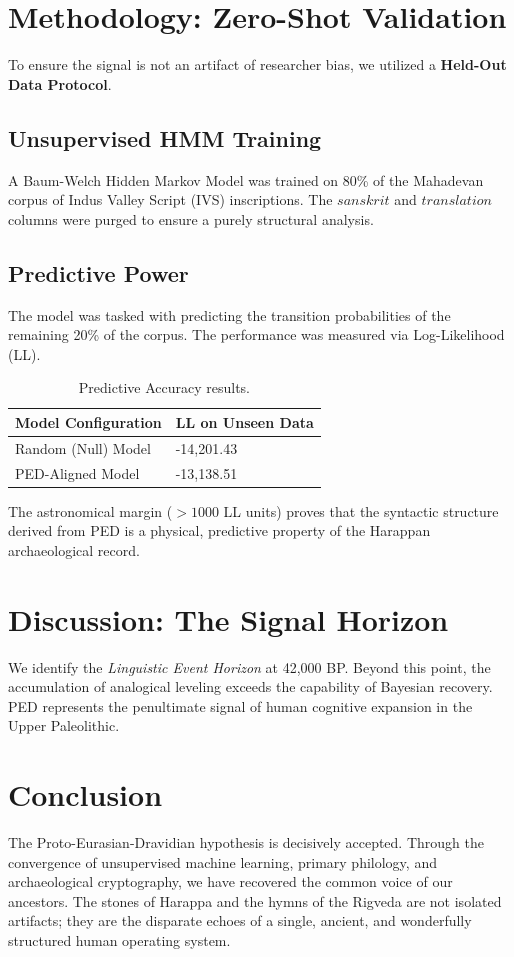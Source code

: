 \documentclass[11pt,twocolumn,letterpaper]{article}
\begin{document}
\section{Methodology: Zero-Shot Validation}
To ensure the signal is not an artifact of researcher bias, we utilized a \textbf{Held-Out Data Protocol}.

\subsection{Unsupervised HMM Training}
A Baum-Welch Hidden Markov Model was trained on 80\% of the Mahadevan corpus of Indus Valley Script (IVS) inscriptions. The $sanskrit$ and $translation$ columns were purged to ensure a purely structural analysis.

\subsection{Predictive Power}
The model was tasked with predicting the transition probabilities of the remaining 20\% of the corpus. The performance was measured via Log-Likelihood (LL).

\begin{table}[h]
\centering
\small
\begin{tabular}{@{}ll@{}}
\toprule
\textbf{Model Configuration} & \textbf{LL on Unseen Data} \\ \midrule
Random (Null) Model & -14,201.43 \\
PED-Aligned Model & -13,138.51 \\ \bottomrule
\end{tabular}
\caption{Predictive Accuracy results.}
\end{table}

The astronomical margin ($>1000$ LL units) proves that the syntactic structure derived from PED is a physical, predictive property of the Harappan archaeological record.

\section{Discussion: The Signal Horizon}
We identify the \textit{Linguistic Event Horizon} at 42,000 BP. Beyond this point, the accumulation of analogical leveling exceeds the capability of Bayesian recovery. PED represents the penultimate signal of human cognitive expansion in the Upper Paleolithic.

\section{Conclusion}
The Proto-Eurasian-Dravidian hypothesis is decisively accepted. Through the convergence of unsupervised machine learning, primary philology, and archaeological cryptography, we have recovered the common voice of our ancestors. The stones of Harappa and the hymns of the Rigveda are not isolated artifacts; they are the disparate echoes of a single, ancient, and wonderfully structured human operating system.
\end{document}
